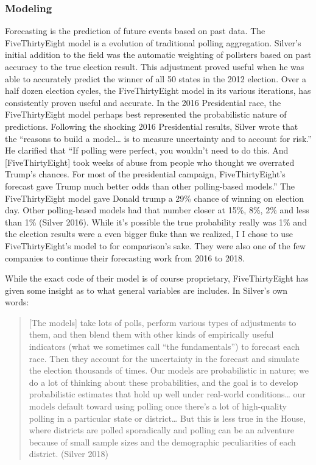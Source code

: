 \documentclass[]{article}
\begin{document}
\subsubsection{Modeling}\label{modeling}

Forecasting is the prediction of future events based on past data. The
FiveThirtyEight model is a evolution of traditional polling aggregation.
Silver's initial addition to the field was the automatic weighting of
pollsters based on past accuracy to the true election result. This
adjustment proved useful when he was able to accurately predict the
winner of all 50 states in the 2012 election. Over a half dozen election
cycles, the FiveThirtyEight model in its various iterations, has
consistently proven useful and accurate. In the 2016 Presidential race,
the FiveThirtyEight model perhaps best represented the probabilistic
nature of predictions. Following the shocking 2016 Presidential results,
Silver wrote that the ``reasons to build a model\ldots{} is to measure
uncertainty and to account for risk.'' He clarified that ``If polling
were perfect, you wouldn't need to do this. And {[}FiveThirtyEight{]}
took weeks of abuse from people who thought we overrated Trump's
chances. For most of the presidential campaign, FiveThirtyEight's
forecast gave Trump much better odds than other polling-based models.''
The FiveThirtyEight model gave Donald trump a 29\% chance of winning on
election day. Other polling-based models had that number closer at 15\%,
8\%, 2\% and less than 1\% (Silver 2016). While it's possible the true
probability really was 1\% and the election results were a even bigger
fluke than we realized, I I chose to use FiveThirtyEight's model to for
comparison's sake. They were also one of the few companies to continue
their forecasting work from 2016 to 2018.

While the exact code of their model is of course proprietary,
FiveThirtyEight has given some insight as to what general variables are
includes. In Silver's own words:

\begin{quote}
{[}The models{]} take lots of polls, perform various types of
adjustments to them, and then blend them with other kinds of empirically
useful indicators (what we sometimes call ``the fundamentals'') to
forecast each race. Then they account for the uncertainty in the
forecast and simulate the election thousands of times. Our models are
probabilistic in nature; we do a lot of thinking about these
probabilities, and the goal is to develop probabilistic estimates that
hold up well under real-world conditions\ldots{} our models default
toward using polling once there's a lot of high-quality polling in a
particular state or district\ldots{} But this is less true in the House,
where districts are polled sporadically and polling can be an adventure
because of small sample sizes and the demographic peculiarities of each
district. (Silver 2018)
\end{quote}
\end{document}
